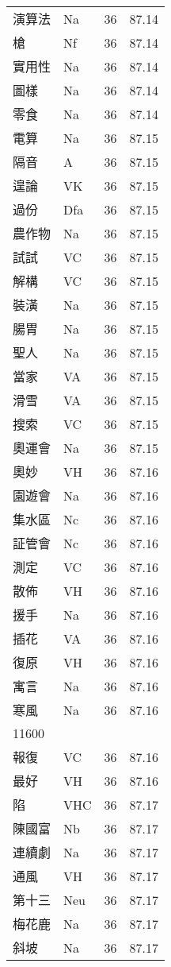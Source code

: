 \documentclass[twocolumn]{book}
\begin{document}
\begin{supertabular}{llrr}
演算法 & Na & 36 &  87.14\\
槍 & Nf & 36 &  87.14\\
實用性 & Na & 36 &  87.14\\
圖樣 & Na & 36 &  87.14\\
零食 & Na & 36 &  87.14\\
電算 & Na & 36 &  87.15\\
隔音 & A & 36 &  87.15\\
遑論 & VK & 36 &  87.15\\
過份 & Dfa & 36 &  87.15\\
農作物 & Na & 36 &  87.15\\
試試 & VC & 36 &  87.15\\
解構 & VC & 36 &  87.15\\
裝潢 & Na & 36 &  87.15\\
腸胃 & Na & 36 &  87.15\\
聖人 & Na & 36 &  87.15\\
當家 & VA & 36 &  87.15\\
滑雪 & VA & 36 &  87.15\\
搜索 & VC & 36 &  87.15\\
奧運會 & Na & 36 &  87.15\\
奧妙 & VH & 36 &  87.16\\
園遊會 & Na & 36 &  87.16\\
集水區 & Nc & 36 &  87.16\\
証管會 & Nc & 36 &  87.16\\
測定 & VC & 36 &  87.16\\
散佈 & VH & 36 &  87.16\\
援手 & Na & 36 &  87.16\\
插花 & VA & 36 &  87.16\\
復原 & VH & 36 &  87.16\\
寓言 & Na & 36 &  87.16\\
寒風 & Na & 36 &  87.16\\
11600\\
報復 & VC & 36 &  87.16\\
最好 & VH & 36 &  87.16\\
陷 & VHC & 36 &  87.17\\
陳國富 & Nb & 36 &  87.17\\
連續劇 & Na & 36 &  87.17\\
通風 & VH & 36 &  87.17\\
第十三 & Neu & 36 &  87.17\\
梅花鹿 & Na & 36 &  87.17\\
斜坡 & Na & 36 &  87.17\\

\end{supertabular}
\end{document}
